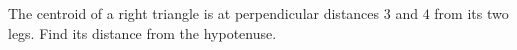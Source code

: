 The centroid of a right triangle is at perpendicular distances $3$ and $4$ from its two legs. Find its distance from the hypotenuse.
